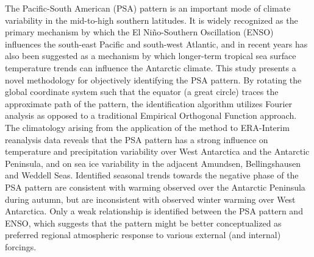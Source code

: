 The Pacific-South American (PSA) pattern is an important mode of climate variability in the mid-to-high southern latitudes. It is widely recognized as the primary mechanism by which the El Ni\~{n}o-Southern Oscillation (ENSO) influences the south-east Pacific and south-west Atlantic, and in recent years has also been suggested as a mechanism by which longer-term tropical sea surface temperature trends can influence the Antarctic climate. This study presents a novel methodology for objectively identifying the PSA pattern. By rotating the global coordinate system such that the equator (a great circle) traces the approximate path of the pattern, the identification algorithm utilizes Fourier analysis as opposed to a traditional Empirical Orthogonal Function approach. The climatology arising from the application of the method to ERA-Interim reanalysis data reveals that the PSA pattern has a strong influence on temperature and precipitation variability over West Antarctica and the Antarctic Peninsula, and on sea ice variability in the adjacent Amundsen, Bellingshausen and Weddell Seas. Identified seasonal trends towards the negative phase of the PSA pattern are consistent with warming observed over the Antarctic Peninsula during autumn, but are inconsistent with observed winter warming over West Antarctica. Only a weak relationship is identified between the PSA pattern and ENSO, which suggests that the pattern might be better conceptualized as preferred regional atmospheric response to various external (and internal) forcings.